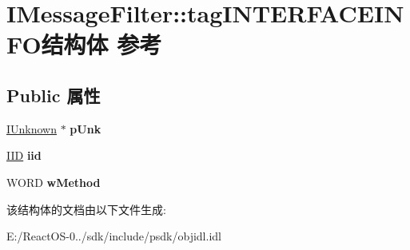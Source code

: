 \hypertarget{struct_i_message_filter_1_1tag_i_n_t_e_r_f_a_c_e_i_n_f_o}{}\section{I\+Message\+Filter\+:\+:tag\+I\+N\+T\+E\+R\+F\+A\+C\+E\+I\+N\+F\+O结构体 参考}
\label{struct_i_message_filter_1_1tag_i_n_t_e_r_f_a_c_e_i_n_f_o}
\subsection*{Public 属性}
\begin{DoxyCompactItemize}
\item 
\mbox{\label{struct_i_message_filter_1_1tag_i_n_t_e_r_f_a_c_e_i_n_f_o_a57910a436ec6b306a5ab815f5a6e409c}} 
\hyperlink{interface_i_unknown}{I\+Unknown} $\ast$ {\bfseries p\+Unk}
\item 
\mbox{\label{struct_i_message_filter_1_1tag_i_n_t_e_r_f_a_c_e_i_n_f_o_a902de13838c560b33bf0bf7295f02f0c}} 
\hyperlink{struct___i_i_d}{I\+ID} {\bfseries iid}
\item 
\mbox{\label{struct_i_message_filter_1_1tag_i_n_t_e_r_f_a_c_e_i_n_f_o_ae68b15a784b25b68d7e53b8ead036d1f}} 
W\+O\+RD {\bfseries w\+Method}
\end{DoxyCompactItemize}


该结构体的文档由以下文件生成\+:\begin{DoxyCompactItemize}
\item 
E\+:/\+React\+O\+S-\/0../sdk/include/psdk/objidl.\+idl\end{DoxyCompactItemize}
